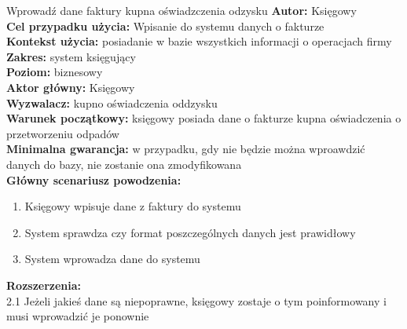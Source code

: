 \begin{usecase}{Wprowadź dane faktury kupna oświadzczenia odzysku}
	\textbf{Autor:} Księgowy\\
	\textbf{Cel przypadku użycia:} Wpisanie do systemu danych o fakturze \\
	\textbf{Kontekst użycia:} posiadanie w bazie wszystkich informacji o operacjach firmy\\
	\textbf{Zakres:} system księgujący \\
	\textbf{Poziom:} biznesowy \\
	\textbf{Aktor główny:} Księgowy \\
	\textbf{Wyzwalacz:} kupno oświadczenia oddzysku \\
	\textbf{Warunek początkowy:} księgowy posiada dane o fakturze kupna oświadczenia o przetworzeniu odpadów \\
	\textbf{Minimalna gwarancja:} w przypadku, gdy nie będzie można wproawdzić danych do bazy, nie zostanie ona zmodyfikowana \\
	\textbf{Główny scenariusz powodzenia:} 
		\begin{enumerate}
			\item Księgowy wpisuje dane z faktury do systemu
			\item System sprawdza czy format poszczególnych danych jest prawidłowy
			\item System wprowadza dane do systemu
		\end{enumerate}
	\textbf{Rozszerzenia:} \\
	2.1 Jeżeli jakieś dane są niepoprawne, księgowy zostaje o tym poinformowany i musi wprowadzić je ponownie
\end{usecase}

